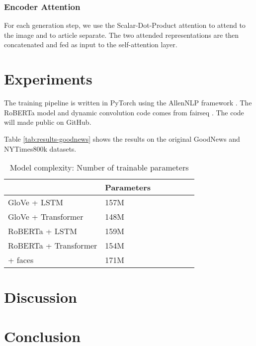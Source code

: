 \documentclass[10pt,twocolumn,letterpaper]{article}
\begin{document}
\subsubsection{Encoder Attention}

For each generation step, we use the Scalar-Dot-Product attention
\cite{Vaswani2017AttentionIA} to attend to the image and to article separate.
The two attended representations are then concatenated and fed as input to
the self-attention layer.






\section{Experiments}

The training pipeline is written in PyTorch \cite{Paszke2017Automatic} using
the AllenNLP framework \cite{Gardner2017AllenNLP}. The RoBERTa model and
dynamic convolution code comes from fairseq \cite{Ott2019Fairseq}. The code
will made public on GitHub.

Table \ref{tab:results-goodnews} shows the results on the original GoodNews
and NYTimes800k datasets.


\begin{table}[t]
	\caption {Model complexity: Number of trainable parameters}
	\label{tab:models}
	\centering
	\begin{tabular}{lllllll}
		\toprule
        & Parameters \\
      \midrule
      GloVe + LSTM & 157M \\
      GloVe + Transformer & 148M \\
      RoBERTa + LSTM & 159M \\
      RoBERTa + Transformer & 154M \\
        + faces & 171M \\
		\bottomrule
	\end{tabular}
\end{table}

\section{Discussion}




\section{Conclusion}

{\small


}
\end{document}
